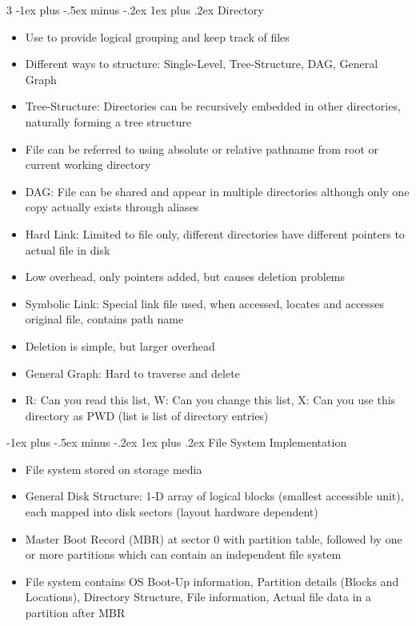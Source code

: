 \documentclass[10pt, landscape]{article}
\makeatletter
\renewcommand{\subsection}{\@startsection{subsection}{3}{0mm}%
                                {-1ex plus -.5ex minus -.2ex}%
                                {1ex plus .2ex}%
                                {\normalfont\small\bfseries}}%
\makeatother
\begin{document}
\begin{multicols*}{3}
\subsection{Directory}
\begin{itemize}
    \item Use to provide logical grouping and keep track of files
    \item Different ways to structure: Single-Level, Tree-Structure, DAG, General Graph
    \item Tree-Structure: Directories can be recursively embedded in other directories, naturally forming a tree structure
    \item File can be referred to using absolute or relative pathname from root or current working directory
    \item DAG: File can be shared and appear in multiple directories although only one copy actually exists through aliases
    \item Hard Link: Limited to file only, different directories have different pointers to actual file in disk
    \item Low overhead, only pointers added, but causes deletion problems
    \item Symbolic Link: Special link file used, when accessed, locates and accesses original file, contains path name
    \item Deletion is simple, but larger overhead
    \item General Graph: Hard to traverse and delete
    \item R: Can you read this list, W: Can you change this list, X: Can you use this directory as PWD (list is list of directory entries)
\end{itemize}

\subsection{File System Implementation}
\begin{itemize}
    \item File system stored on storage media
    \item General Disk Structure: 1-D array of logical blocks (smallest accessible unit), each mapped into disk sectors (layout hardware dependent)
    \item Master Boot Record (MBR) at sector 0 with partition table, followed by one or more partitions which can contain an independent file system
    \item File system contains OS Boot-Up information, Partition details (Blocks and Locations), Directory Structure, File information, Actual file data in a partition after MBR
\end{itemize}


\end{multicols*}
\end{document}
